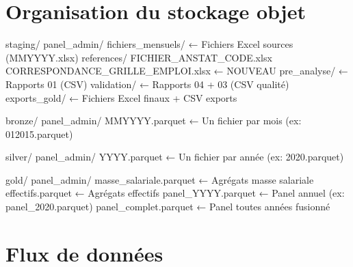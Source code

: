 \documentclass[12pt,a4paper,french]{report}
\begin{document}
\section{Organisation du stockage objet}

\begin{codebox}
staging/
  panel\_admin/
    fichiers\_mensuels/       ← Fichiers Excel sources (MMYYYY.xlsx)
    references/
      FICHIER\_ANSTAT\_CODE.xlsx
      CORRESPONDANCE\_GRILLE\_EMPLOI.xlsx   ← NOUVEAU
    pre\_analyse/             ← Rapports 01 (CSV)
    validation/              ← Rapports 04 + 03 (CSV qualité)
    exports\_gold/            ← Fichiers Excel finaux + CSV exports

bronze/
  panel\_admin/
    MMYYYY.parquet            ← Un fichier par mois (ex: 012015.parquet)

silver/
  panel\_admin/
    YYYY.parquet              ← Un fichier par année (ex: 2020.parquet)

gold/
  panel\_admin/
    masse\_salariale.parquet  ← Agrégats masse salariale
    effectifs.parquet         ← Agrégats effectifs
    panel\_YYYY.parquet       ← Panel annuel (ex: panel\_2020.parquet)
    panel\_complet.parquet    ← Panel toutes années fusionné
\end{codebox}

\section{Flux de données}

\end{document}
